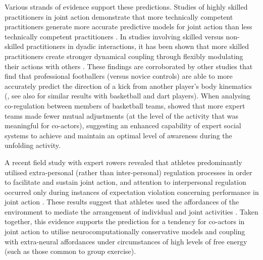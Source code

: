 \begin{CJK}{UTF8}{gbsn}
    Various strands of evidence support these predictions.  Studies of highly skilled practitioners in joint action demonstrate that more technically competent practitioners generate more accurate predictive models for joint action than less technically competent practitioners \citep{Tomeo2012,Aglioti2008,Mulligan2016}.   In studies involving skilled versus non-skilled practitioners in dyadic interactions, it has been shown that more skilled practitioners create stronger dynamical coupling through flexibly modulating their actions with others \citep{Schmidt2011,Caron2017}. These findings are corroborated by other studies that find that professional footballers (versus novice controls) are able to more accurately predict the direction of a kick from another player's body kinematics (\cite{Tomeo2012}, see also \cite{Aglioti2008,Mulligan2016} for similar results with basketball and dart players).  When analysing co-regulation between members of basketball teams, \textcite{Bourbousson2015} showed that more expert teams made fewer mutual adjustments (at the level of the activity that was meaningful for co-actors), suggesting an enhanced capability of expert social systems to achieve and maintain an optimal level of awareness during the unfolding activity.

    A recent field study with expert rowers revealed that athletes predominantly utilised
    extra-personal (rather than inter-personal) regulation processes in order to facilitate and sustain joint action, and attention to interpersonal regulation occurred only during instances of expectation violation concerning performance in joint action \citep[; for a full explanation of this study, see Appendix ~\ref{app2:theory} Section ~\ref{sect:rowerStudy}]{RKiouak2016}. These results suggest that athletes used the affordances of the environment to mediate the arrangement of individual and joint activities \citep{Bourbousson2011,Bourbousson2012}.  Taken together, this evidence supports the prediction for a tendency for co-actors in joint action to utilise neurocomputationally conservative models and coupling with extra-neural affordances under circumstances of high levels of free energy (such as those common to group exercise).


\end{CJK}

